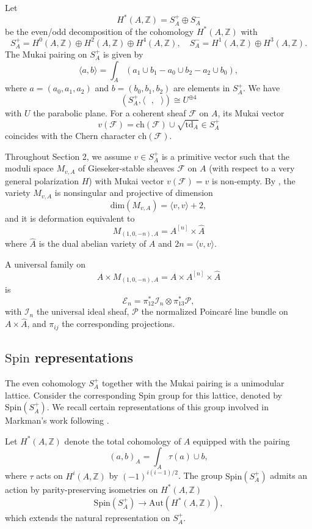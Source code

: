 \documentclass[11pt]{amsart}
\theoremstyle{plain}
\theoremstyle{definition}
\theoremstyle{remark}
\newcommand{\BZ}{{\mathbb{Z}}}
\newcommand{\CE}{{\mathcal E}}
\newcommand{\CF}{{\mathcal F}}
\newcommand{\CI}{{\mathcal I}}
\newcommand{\CP}{{\mathcal P}}
\begin{document}
Let 
\[
H^\ast(A, \BZ) = S_A^+ \oplus S_A^-
\]
be the even/odd decomposition of the cohomology $H^\ast(A, \BZ)$ with
\[
S_A^+ = H^0(A, \BZ) \oplus H^2(A, \BZ)\oplus H^4(A,\BZ), \quad S_A^- = H^1(A,\BZ)\oplus H^3(A,\BZ).
\]
The Mukai pairing on $S_A^+$ is given by
\begin{equation}\label{Mukai_pair}
\langle a, b \rangle = \int_A {(a_1\cup b_1 - a_0\cup b_2-a_2\cup b_0)},
\end{equation}
where $a=(a_0, a_1,a_2)$ and $b=(b_0, b_1, b_2)$ are elements in $S_A^+$. We have
\[
(S_A^+, \langle ~~~, ~~~ \rangle) \cong U^{\oplus 4}
\]
with $U$ the parabolic plane. For a coherent sheaf $\CF$ on $A$, its Mukai vector 
\[
v(\CF) = \mathrm{ch}(\CF) \cup \sqrt{\mathrm{td}_A}  \in S_A^+
\]
coincides with the Chern character $\mathrm{ch}(\CF)$.

Throughout Section 2, we assume $v \in S_A^+$ is a primitive vector such that the moduli space $M_{v,A}$ of Gieseker-stable sheaves $\CF$ on $A$ (with respect to a very general polarization $H$) with Mukai vector $v(\CF) = v$ is non-empty. By \cite[Theorem 0.1]{Yo}, the variety $M_{v,A}$ is nonsingular and projective of dimension
\[
\mathrm{dim} (M_{v,A}) = \langle v,v\rangle +2,
\]
and it is deformation equivalent to 
\[
M_{(1,0,-n), A} = A^{[n]} \times \hat{A}
\]
where $\hat{A}$ is the dual abelian variety of $A$ and {$2n = \langle v ,v \rangle$.} 

A universal family on 
\[
A \times M_{(1,0,-n), A} = A \times A^{[n]} \times  \hat{A}
\]
is 
\begin{equation}\label{univ_ideal}
\CE_n = \pi_{12}^\ast \CI_n \otimes \pi_{13}^\ast \CP,
\end{equation}
with $\CI_n$ the universal ideal sheaf, $\CP$ the normalized Poincar\'e line bundle on $A \times \hat{A}$, and $\pi_{ij}$ the corresponding projections. 

\subsection{$\mathrm{Spin}$ representations}\label{spin8reps} 

The even cohomology $S_A^+$ together with the Mukai pairing is a unimodular lattice.  
Consider the corresponding Spin group for this lattice, denoted by $\mathrm{Spin}(S_A^+)$. We recall certain representations of this group involved in Markman's work following \cite[Section 3]{Markman3}.

Let $H^*(A,\BZ)$ denote the total cohomology of $A$ equipped with the pairing
\begin{equation}\label{pairing}
(a,b)_A = \int_{A}\tau(a)\cup b,
\end{equation}
where $\tau$ acts on $H^i(A,\BZ)$ by $(-1)^{i(i-1)/2}$.
The group $\mathrm{Spin}(S_A^+)$ admits an action by  parity-preserving  isometries on $H^*(A, \BZ)$
\[\mathrm{Spin}(S_A^+) \rightarrow \mathrm{Aut}(H^*(A, \BZ)),\]
which extends the natural representation on $S_A^+$.
\end{document}
